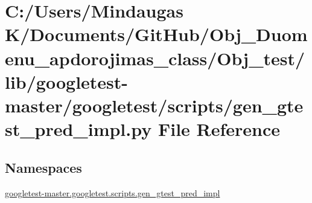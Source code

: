 \hypertarget{_obj__test_2lib_2googletest-master_2googletest_2scripts_2gen__gtest__pred__impl_8py}{}\section{C\+:/\+Users/\+Mindaugas K/\+Documents/\+Git\+Hub/\+Obj\+\_\+\+Duomenu\+\_\+apdorojimas\+\_\+class/\+Obj\+\_\+test/lib/googletest-\/master/googletest/scripts/gen\+\_\+gtest\+\_\+pred\+\_\+impl.py File Reference}
\label{_obj__test_2lib_2googletest-master_2googletest_2scripts_2gen__gtest__pred__impl_8py}
\subsection*{Namespaces}
\begin{DoxyCompactItemize}
\item 
 \mbox{\hyperlink{namespacegoogletest-master_1_1googletest_1_1scripts_1_1gen__gtest__pred__impl}{googletest-\/master.\+googletest.\+scripts.\+gen\+\_\+gtest\+\_\+pred\+\_\+impl}}
\end{DoxyCompactItemize}
